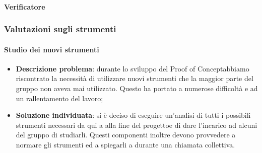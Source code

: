 			\paragraph{Verificatore}
		\subsubsection{Valutazioni sugli strumenti}
			\paragraph{Studio dei nuovi strumenti}
				\begin{itemize}
					\item \textbf{Descrizione problema}: durante lo sviluppo del Proof of Concept\glosp abbiamo riscontrato la necessità di utilizzare nuovi strumenti che la maggior parte del gruppo non aveva mai utilizzato. Questo ha portato a numerose difficoltà e ad un rallentamento del lavoro;
					\item \textbf{Soluzione individuata}: si è deciso di eseguire un'analisi di tutti i possibili strumenti necessari da qui a alla fine del progetto\glosp e di dare l'incarico ad alcuni del gruppo di studiarli. Questi componenti inoltre devono provvedere a normare gli strumenti ed a spiegarli a durante una chiamata collettiva.
				\end{itemize}